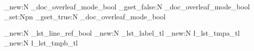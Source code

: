 
\usepackage[english]{babel}
\usepackage{metalogo}
\usepackage{tcolorbox}
\usepackage{booktabs}
\usepackage{microtype}
\usepackage{expl3}
\usepackage{mdframed}
\usepackage{chngcntr}
\usepackage{etoolbox}
\usepackage{adjustbox}
\usepackage{supertabular}
\usepackage{makecell}
\usepackage{tikz}
\usepackage{ragged2e}
\usepackage{float}
\usepackage{array}
\usepackage{xcolor}
\usepackage{datetime2}
\usepackage[scale=0.9]{tgheros}

\ExplSyntaxOn

\bool_new:N \g_doc_overleaf_mode_bool
\bool_gset_false:N \g_doc_overleaf_mode_bool
\cs_set:Npn \UseOverleafMode
{
    \bool_gset_true:N \g_doc_overleaf_mode_bool
}
\ExplSyntaxOff


\usepackage[breaklinks]{hyperref}
\usepackage[capitalise]{cleveref}



\newcommand*{\LT}{\texorpdfstring{\LaTeX}{LaTeX}}
\newcommand*{\LTT}{\texorpdfstring{\LaTeX3}{LaTeX3}}
\let\liii\LTT


\newcommand{\ListOfCodeExampleName}{List of Examples}
\makeatletter
\newcommand{\ListOfCodeExample}{\section*{\ListOfCodeExampleName}\@starttoc{CodeExample}}
\makeatother


\makeatletter
\ExplSyntaxOn
\bool_new:N \g_lst_line_ref_bool
\tl_new:N \g_lst_label_tl
\tl_new:N \l_lst_tmpa_tl
\tl_new:N \l_lst_tmpb_tl

\newcommand{\SetLstRefLabel}[1]{\tl_gset:Nn \g_lst_label_tl {#1}}


